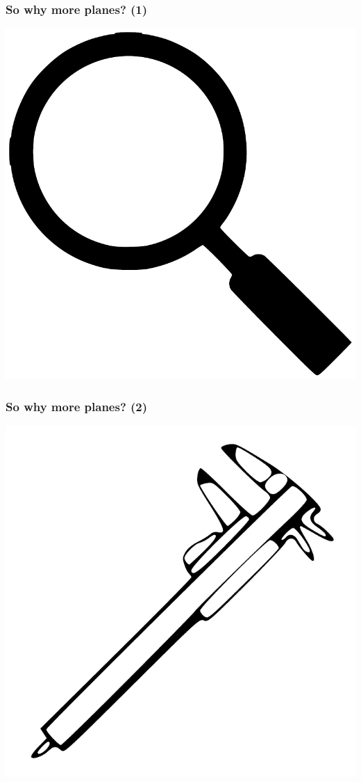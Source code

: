 \documentclass[20pt]{beamer}
\begin{document}
\begin{frame}
\frametitle{So why more planes? (1)}
\begin{center}
\includegraphics[]{Figures/MagnifyingGlass.pdf}
\end{center}
\end{frame}
\begin{frame}
\frametitle{So why more planes? (2)}
\begin{center}
\includegraphics[scale=1.2]{Figures/Calipers.pdf}
\end{center}
\end{frame}
\end{document}
